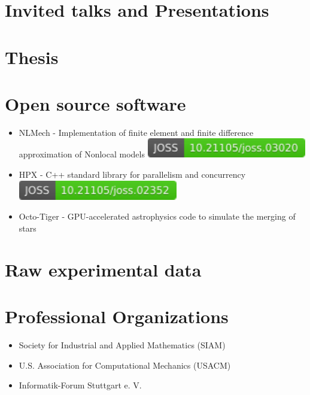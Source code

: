 \documentclass[11pt,a4paper,sans]{moderncv}
\begin{document}
\section{Invited talks and Presentations}

\section{Thesis}
\section{Open source software}
\cvitem{}{}
\begin{itemize}[leftmargin=4cm]
\item NLMech - Implementation of finite element and finite difference approximation of Nonlocal models \href{https://doi.org/10.21105/joss.03020}{\includegraphics[scale=0.5]{status-nlmech-small.pdf}}
\item HPX - C++ standard library for parallelism and concurrency \href{https://doi.org/10.21105/joss.02352}{\includegraphics[scale=0.5]{status-hpx.pdf}}
\item Octo-Tiger - GPU-accelerated astrophysics code to simulate the merging of stars
\end{itemize}


\section{Raw experimental data}
\section{Professional Organizations}
\cvitem{}{}
\begin{itemize}[leftmargin=4cm]
\item Society for Industrial and Applied Mathematics (SIAM)
\item U.S. Association for Computational Mechanics (USACM)
\item Informatik-Forum Stuttgart e. V.
\end{itemize}
\end{document}
